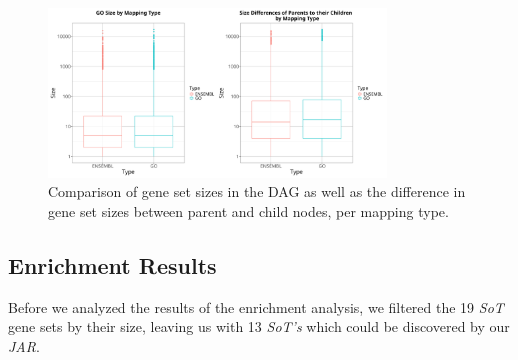 \documentclass[12pt]{article}
\begin{document}
\begin{figure}[!htbp]
    \centering
    \includegraphics[width=0.8\textwidth]{./plots/goSizes.png}
    \caption{Comparison of gene set sizes in the DAG as well as the difference in gene set sizes between parent and child nodes, per mapping type.}
    \label{fig:-plots-goSizes-png}
\end{figure}

\newpage
\subsection{Enrichment Results}
Before we analyzed the results of the enrichment analysis, we filtered
the 19 \textit{SoT} gene sets by their size, leaving us with 13 \textit{SoT's}
which could be discovered by our \textit{JAR}.
\end{document}
